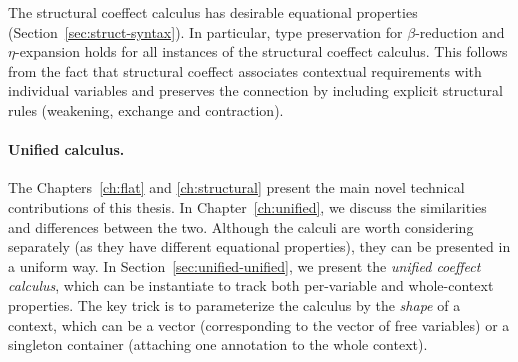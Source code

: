 The structural coeffect calculus has desirable equational properties (Section~\ref{sec:struct-syntax}).
In particular, type preservation for $\beta$-reduction and $\eta$-expansion holds for all instances of the
structural coeffect calculus. This follows from the fact that structural coeffect 
associates contextual requirements with individual variables and preserves the connection by 
including explicit structural rules (weakening, exchange and contraction).


\paragraph{Unified calculus.}

The Chapters~\ref{ch:flat} and \ref{ch:structural} present the main novel technical contributions of this
thesis. In Chapter~\ref{ch:unified}, we discuss the similarities and differences between the two. 
Although the calculi are worth considering separately (as they have different equational properties),
they can be presented in a uniform way. In Section~\ref{sec:unified-unified}, we present the 
\emph{unified coeffect calculus}, which can be instantiate to track both per-variable and 
whole-context properties. The key trick is to parameterize the calculus by the \emph{shape} of 
a context, which can be a vector (corresponding to the vector of free variables) or a singleton
container (attaching one annotation to the whole context).

%                                                                                    
%                                                                                    

